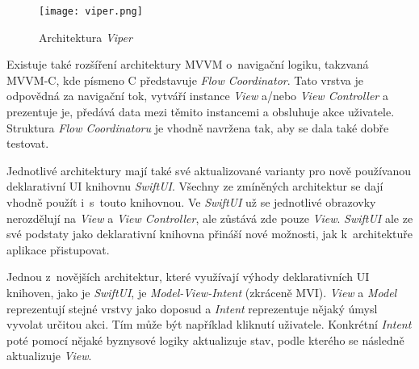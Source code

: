 \begin{figure}[h]
	\centering
	\texttt{[image: viper.png]}
	\caption{Architektura \emph{Viper} \cite{ios-architecture-patterns}}
	\label{fig:viper}
\end{figure}

Existuje také rozšíření architektury MVVM o~navigační logiku, takzvaná MVVM-C, kde písmeno C představuje \emph{Flow Coordinator}. Tato vrstva je odpovědná za navigační tok, vytváří instance \emph{View} a/nebo \emph{View Controller} a prezentuje je, předává data mezi těmito instancemi a obsluhuje akce uživatele. Struktura \emph{Flow Coordinatoru} je vhodně navržena tak, aby se dala také dobře testovat. \cite{ios-mvvm-c}

Jednotlivé architektury mají také své aktualizované varianty pro nově používanou deklarativní UI knihovnu \emph{SwiftUI}. Všechny ze zmíněných architektur se dají vhodně použít i~s~touto knihovnou. Ve \emph{SwiftUI} už se jednotlivé obrazovky nerozdělují na \emph{View} a \emph{View Controller}, ale zůstává zde pouze \emph{View}. \emph{SwiftUI} ale ze své podstaty jako deklarativní knihovna přináší nové možnosti, jak k~architektuře aplikace přistupovat.

Jednou z~novějších architektur, které využívají výhody deklarativních UI knihoven, jako je \emph{SwiftUI}, je \emph{Model-View-Intent} (zkráceně MVI). \emph{View} a \emph{Model} reprezentují stejné vrstvy jako doposud a \emph{Intent} reprezentuje nějaký úmysl vyvolat určitou akci. Tím může být například kliknutí uživatele. Konkrétní \emph{Intent} poté pomocí nějaké byznysové logiky aktualizuje stav, podle kterého se následně aktualizuje \emph{View}. \cite{swiftui-mvi}

